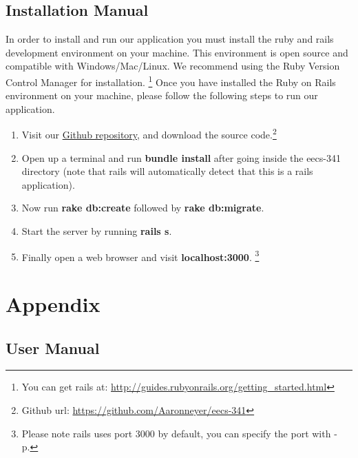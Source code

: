 \documentclass[12pt,letterpaper]{article}
\begin{document}
\subsection{Installation Manual}
In order to install and run our application you must install the ruby and rails development environment on your machine. This environment is open source and compatible with Windows/Mac/Linux. We recommend using the Ruby Version Control Manager for installation. \footnote{You can get rails at: \url{http://guides.rubyonrails.org/getting_started.html}} Once you have installed the Ruby on Rails environment on your machine, please follow the following steps to run our application.

\begin{enumerate}

\item Visit our \href{http://www.github.com/aaronneyer/eecs-341}{Github repository}, and download the source code.\footnote{Github url: \url{https://github.com/Aaronneyer/eecs-341}}

\item Open up a terminal and run {\bf bundle install} after going inside the eecs-341 directory (note that rails will automatically detect that this is a rails application).

\item Now run {\bf rake db:create } followed by {\bf rake db:migrate}.

\item Start the server by running {\bf rails s}.

\item Finally open a web browser and visit {\bf localhost:3000}. \footnote{Please note rails uses port 3000 by default, you can specify the port with -p.}

\end{enumerate}


\clearpage\null
\section{Appendix}


\subsection{User Manual}
\clearpage\null
\end{document}
